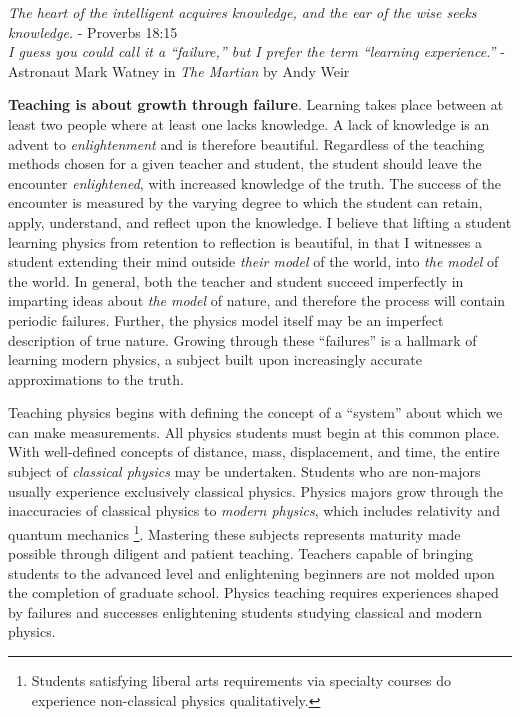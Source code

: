 \documentclass[../../main.tex]{subfiles}
\begin{document}
\epigraph{\textit{The heart of the intelligent acquires knowledge, and the ear of the wise seeks knowledge.} - Proverbs 18:15 \\ \vspace{0.1cm} \textit{I guess you could call it a ``failure,'' but I prefer the term ``learning experience.''} - Astronaut Mark Watney in \textit{The Martian} by Andy Weir}{}

\textbf{Teaching is about growth through failure}.  Learning takes place between at least two people where at least one lacks knowledge.  A lack of knowledge is an advent to \textit{enlightenment} and is therefore beautiful.  Regardless of the teaching methods chosen for a given teacher and student, the student should leave the encounter \textit{enlightened}, with increased knowledge of the truth.  The success of the encounter is measured by the varying degree to which the student can retain, apply, understand, and reflect upon the knowledge.  I believe that lifting a student learning physics from retention to reflection is beautiful, in that I witnesses a student extending their mind outside \textit{their model} of the world, into \textit{the model} of the world.  In general, both the teacher and student succeed imperfectly in imparting ideas about \textit{the model} of nature, and therefore the process will contain periodic failures.  Further, the physics model itself may be an imperfect description of true nature.  Growing through these ``failures'' is a hallmark of learning modern physics, a subject built upon increasingly accurate approximations to the truth. \\ \hspace{0.1cm}

Teaching physics begins with defining the concept of a ``system'' about which we can make measurements.  All physics students must begin at this common place.  With well-defined concepts of distance, mass, displacement, and time, the entire subject of \textit{classical physics} may be undertaken.  Students who are non-majors usually experience exclusively classical physics.  Physics majors grow through the inaccuracies of classical physics to \textit{modern physics}, which includes relativity and quantum mechanics \footnote{Students satisfying liberal arts requirements via specialty courses do experience non-classical physics qualitatively.}.  Mastering these subjects represents maturity made possible through diligent and patient teaching.  Teachers capable of bringing students to the advanced level and enlightening beginners are not molded upon the completion of graduate school.  Physics teaching requires experiences shaped by failures and successes enlightening students studying classical and modern physics. \\ \hspace{0.1cm}
\end{document}

